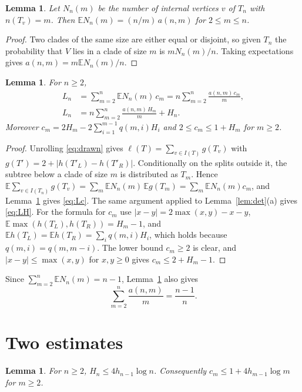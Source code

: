 \documentclass[11pt]{amsart}
\newtheorem{lemma}[theorem]{Lemma}
\theoremstyle{remark}
\numberwithin{equation}{section}
\newcommand{\E}{\mathbb E}
\begin{document}
\begin{lemma}\label{lem:clades}
Let $N_n(m)$ be the number of internal vertices $v$ of $T_n$ with $n(T_v)=m$. Then $\E N_n(m)=(n/m)\,a(n,m)$ for $2\le m\le n$.
\end{lemma}

\begin{proof}
Two clades of the same size are either equal or disjoint, so given $T_n$ the probability that $V$ lies in a clade of size $m$ is $mN_n(m)/n$. Taking expectations gives $a(n,m)=m\E N_n(m)/n$.
\end{proof}

\begin{lemma}\label{lem:mean}
For $n\ge2$,
\begin{align}
 L_n&=\sum_{m=2}^n\E N_n(m)\,c_m=n\sum_{m=2}^n\frac{a(n,m)\,c_m}{m},\label{eq:Lc}\\
 L_n&=n\sum_{m=2}^n\frac{a(n,m)\,H_m}{m}+H_n.\label{eq:LH}
\end{align}
Moreover $c_m=2H_m-2\sum_{i=1}^{m-1}q(m,i)H_i$ and $2\le c_m\le1+H_m$ for $m\ge2$.
\end{lemma}

\begin{proof}
Unrolling \eqref{eq:drawn} gives $\ell(T)=\sum_{v\in I(T)}g(T_v)$ with $g(T')=2+|h(T'_L)-h(T'_R)|$. Conditionally on the splits outside it, the subtree below a clade of size $m$ is distributed as $T_m$. Hence $\E\sum_{v\in I(T_n)}g(T_v)=\sum_m\E N_n(m)\,\E g(T_m)=\sum_m\E N_n(m)c_m$, and Lemma~\ref{lem:clades} gives \eqref{eq:Lc}. The same argument applied to Lemma~\ref{lem:det}(a) gives \eqref{eq:LH}. For the formula for $c_m$ use $|x-y|=2\max(x,y)-x-y$, $\E\max(h(T_L),h(T_R))=H_m-1$, and $\E h(T_L)=\E h(T_R)=\sum_iq(m,i)H_i$, which holds because $q(m,i)=q(m,m-i)$. The lower bound $c_m\ge2$ is clear, and $|x-y|\le\max(x,y)$ for $x,y\ge0$ gives $c_m\le2+H_m-1$.
\end{proof}

Since $\sum_{m=2}^n\E N_n(m)=n-1$, Lemma~\ref{lem:clades} also gives
\begin{equation}\label{eq:mass}
 \sum_{m=2}^n\frac{a(n,m)}m=\frac{n-1}n.
\end{equation}

\section{Two estimates}\label{sec:estimates}

\begin{lemma}\label{lem:height}
For $n\ge2$, $H_n\le4h_{n-1}\log n$. Consequently $c_m\le1+4h_{m-1}\log m$ for $m\ge2$.
\end{lemma}
\end{document}
